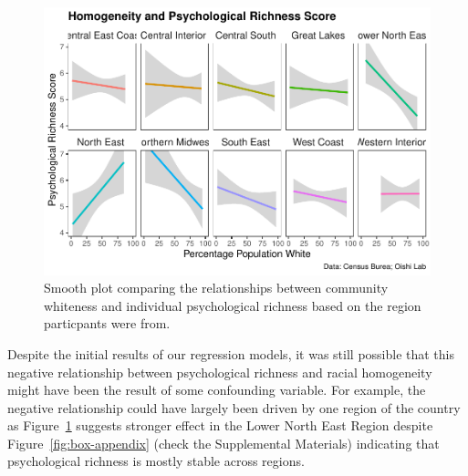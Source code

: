 \documentclass[
  man,floatsintext]{apa7}
\begin{document}
\begin{figure}[H]
\includegraphics[width=1\linewidth]{Richness-Diversity-Markdown_files/figure-latex/e-path-smooth-1} \caption{Smooth plot comparing the relationships between community whiteness and individual psychological richness based on the region particpants were from.}\label{fig:e-path-smooth}
\end{figure}



Despite the initial results of our regression models, it was still possible that this negative relationship between psychological richness and racial homogeneity might have been the result of some confounding variable. For example, the negative relationship could have largely been driven by one region of the country as Figure~\ref{fig:e-path-smooth} suggests stronger effect in the Lower North East Region despite Figure~\ref{fig:box-appendix} (check the Supplemental Materials) indicating that psychological richness is mostly stable across regions.
\end{document}
